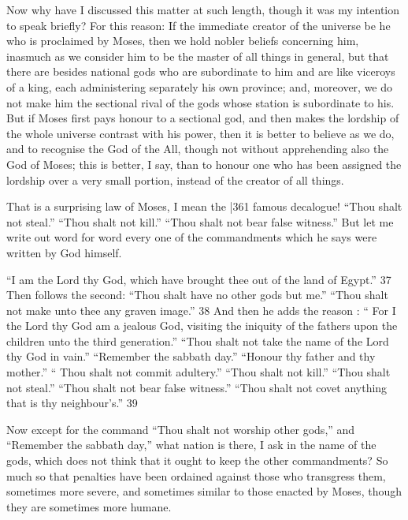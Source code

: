 Now why have I discussed this matter at such length, though it was my intention to speak briefly? For this reason: If the immediate creator of the universe be he who is proclaimed by Moses, then we hold nobler beliefs concerning him, inasmuch as we consider him to be the master of all things in general, but that there are besides national gods who are subordinate to him and are like viceroys of a king, each administering separately his own province; and, moreover, we do not make him the sectional rival of the gods whose station is subordinate to his. But if Moses first pays honour to a sectional god, and then makes the lordship of the whole universe contrast
with his power, then it is better to believe as we do, and to recognise the God of the All, though not without apprehending also the God of Moses; this is better, I say, than to honour one who has been assigned the lordship over a very small portion, instead of the creator of all things.

That is a surprising law of Moses, I mean the |361
famous decalogue! ``Thou shalt not steal.'' ``Thou shalt not kill.'' ``Thou shalt not bear false witness.'' But let me write out word for word every one of the commandments which he says were written by God himself.

``I am the Lord thy God, which have brought thee out of the land of Egypt.''
37 \emph{}Then follows the second: ``Thou shalt have no other gods but me.'' ``Thou shalt not make unto thee any graven image.''
38 And then he adds the reason : `` For I the Lord thy God am a jealous God, visiting the iniquity of the fathers upon the children unto the third generation.'' ``Thou shalt not take the name of the Lord thy God in vain.'' ``Remember the sabbath day.'' ``Honour thy father and thy mother.'' `` Thou shalt not commit adultery.'' ``Thou shalt not kill.'' ``Thou shalt not steal.'' ``Thou shalt not bear false witness.'' ``Thou shalt not covet anything that is thy neighbour's.''
39

Now except for the command ``Thou shalt not worship other gods,'' and ``Remember the sabbath day,'' what nation is there, I ask in the name of the gods, which does not think that it ought to keep the other commandments? So much so that penalties have been ordained against those who transgress them, sometimes more severe, and sometimes similar to those enacted by Moses, though they are sometimes more humane.

